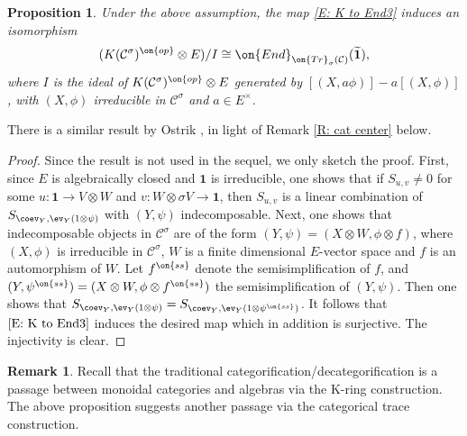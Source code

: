\documentclass[11pt]{amsart}
\newtheorem{prop}[thm]{Proposition}
\theoremstyle{definition}
\theoremstyle{definition}
\newtheorem{rmk}[thm]{Remark}
\theoremstyle{definition}
\numberwithin{equation}{subsection}
\newcommand{\mC}{{\mathcal C}}
\newcommand{\End}{{\on{End}}}
\newcommand{\Tr}{{\on{Tr}}}
\begin{document}
\begin{prop}
\label{L: K iso End}
Under the above assumption, the map \eqref{E: K to End3} induces an isomorphism
\[
(K(\mC^\sigma)^{\on{op}}\otimes E)/I\cong \End_{\Tr_\sigma(\mC)}(\widetilde{\mathbf 1}),
\]
where $I$ is the ideal of $K(\mC^\sigma)^{\on{op}}\otimes E$ generated by $[(X,a\phi)]-a[(X,\phi)]$, with $(X,\phi)$ irreducible in $\mC^\sigma$ and $a\in E^\times$.
\end{prop}
There is a similar result by Ostrik \cite[Corollary 2.16]{O}, in light of Remark \ref{R: cat center} below.
\begin{proof}
Since the result is not used in the sequel, we only sketch the proof. First, since $E$ is algebraically closed and $\mathbf{1}$ is irreducible, one shows that if $S_{u,v}\neq 0$ for some $u:\mathbf{1}\to V\otimes W$ and $v: W\otimes \sigma V\to \mathbf{1}$, then $S_{u,v}$ is a linear combination of $S_{\coev_{Y}, \ev_Y(1\otimes\psi)}$ with $(Y,\psi)$ indecomposable. 
Next, one shows that indecomposable objects in $\mC^\sigma$ are of the form $(Y,\psi)=(X\otimes W, \phi\otimes f)$, where $(X,\phi)$ is irreducible in $\mC^\sigma$, $W$ is a finite dimensional $E$-vector space and $f$ is an automorphism of $W$. Let $f^{\on{ss}}$ denote the semisimplification of $f$, and $(Y,\psi^{\on{ss}})=(X\otimes W,\phi\otimes f^{\on{ss}})$ the semisimplification of $(Y,\psi)$. 
Then one shows that $S_{\coev_{Y}, \ev_Y(1\otimes\psi)}=S_{\coev_{Y},\ev_Y(1\otimes\psi^{\on{ss}})}$. It follows that $\eqref{E: K to End3}$ induces the desired map which in addition is surjective. The injectivity is clear. 
\end{proof}

\begin{rmk}Recall that the traditional categorification/decategorification is a passage between monoidal categories and algebras via the K-ring construction. The above proposition suggests another passage via the categorical trace construction.
\end{rmk}
\end{document}
